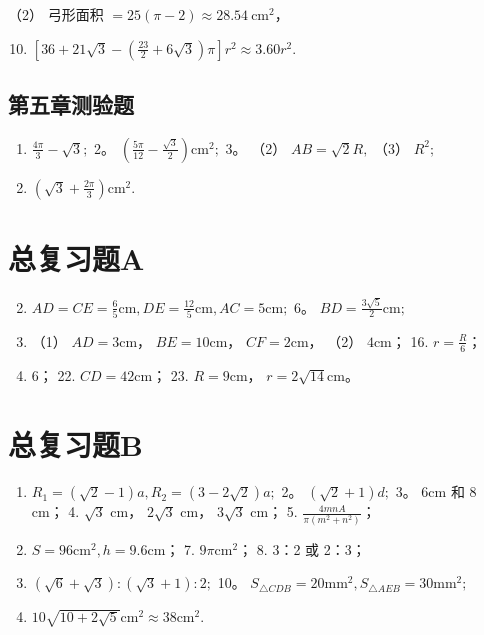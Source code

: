 （2） 弓形面积 \(= 25(\pi - 2) \approx 28.54 \mathrm{~cm}^{2}\)，

\begin{enumerate}
\setcounter{enumi}{9}
\item
  \(\left[36 + 21\sqrt{3} -\left(\frac{23}{2} +6\sqrt{3}\right)\pi\right]r^2\approx 3.60r^2.\)
\end{enumerate}

\subsection{第五章测验题}

\begin{enumerate}
\item
  \(\frac{4\pi}{3} -\sqrt{3};\) 2。
  \(\left(\frac{5\pi}{12} -\frac{\sqrt{3}}{2}\right)\mathrm{cm}^2;\) 3。
  （2） \(AB = \sqrt{2} R,\) （3） \(R^2;\)
\item
  \(\left(\sqrt{3} +\frac{2\pi}{3}\right)\mathrm{cm}^2.\)
\end{enumerate}

\section{总复习题A}

\begin{enumerate}
\setcounter{enumi}{1}
\item
  \(AD = CE = \frac{6}{5}\mathrm{cm}, DE = \frac{12}{5}\mathrm{cm}, AC = 5\mathrm{cm};\)
  6。 \(BD = \frac{3\sqrt{5}}{2}\mathrm{cm};\)
\item
  （1） \(AD = 3\mathrm{cm}\)， \(BE = 10\mathrm{cm}\)，
  \(CF = 2\mathrm{cm}\)， （2） \(4\mathrm{cm}\)； 16.
  \(r = \frac{R}{6}\)；
\item
  6； 22. \(CD = 42\mathrm{cm}\)； 23. \(R = 9\mathrm{cm}\)，
  \(r = 2\sqrt{14}\mathrm{cm}\)。
\end{enumerate}

\section{总复习题B}

\begin{enumerate}
\item
  \(R_{1} = (\sqrt{2} - 1)a, R_{2} = (3 - 2\sqrt{2})a;\) 2。
  \((\sqrt{2} + 1)d;\) 3。 \(6\mathrm{cm}\) 和 8 cm； 4. \(\sqrt{3}\)
  cm， \(2\sqrt{3}\) cm， \(3\sqrt{3}\) cm； 5.
  \(\frac{4mnA}{\pi(m^2 + n^2)}\)；
\item
  \(S = 96\mathrm{cm}^2, h = 9.6\mathrm{cm}\)； 7.
  \(9\pi \mathrm{cm}^2\)； 8. 3：2 或 2：3；
\item
  \((\sqrt{6} + \sqrt{3}): (\sqrt{3} + 1): 2;\) 10。
  \(S_{\triangle CDB} = 20\mathrm{mm}^2, S_{\triangle AEB} = 30\mathrm{mm}^2;\)
\item
  \(10\sqrt{10 + 2\sqrt{5}}\mathrm{cm}^2\approx 38\mathrm{cm}^2.\)
\end{enumerate}


